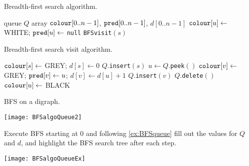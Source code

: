 \begin{algorithm}[H]
  \caption{Breadth-first search algorithm.}
    \label{alg:BFScode}
\begin{algorithmic}[1]
	\State queue $Q$  
	\State array $\operatorname{\text{\texttt{colour}}}[0..n-1]$, $\operatorname{\text{\texttt{pred}}}[0..n-1]$, $d[0..n-1]$ 
		\State $\operatorname{\text{\texttt{colour}}}[u] \gets $ WHITE; $\operatorname{\text{\texttt{pred}}}[u] \gets $ \texttt{null} 
	\EndFor
		 
			\State \texttt{BFSvisit}$(s)$
		\EndIf
	\EndFor
	\State {}
\EndFunction
\end{algorithmic}
\end{algorithm}

\begin{algorithm}[H]
  \caption{Breadth-first search visit algorithm.}
     \label{alg:BFSvisitcode}
  \begin{algorithmic}[1]
	\State $\operatorname{\text{\texttt{colour}}}[s] \gets $ GREY; $d[s] \gets 0$ 
	\State $Q$.\texttt{insert}$(s)$ 
		\State $u \gets Q$.\texttt{peek}$()$  
			 
				\State $\operatorname{\text{\texttt{colour}}}[v] \gets $ GREY; $\operatorname{\text{\texttt{pred}}}[v] \gets u$; $d[v] \gets d[u]+1$
				\State $Q$.\texttt{insert}$(v)$ 
			\EndIf
		\EndFor
		\State $Q$.\texttt{delete}$()$  
		\State $\operatorname{\text{\texttt{colour}}}[u] \gets $ BLACK
	\EndWhile
\EndFunction
\end{algorithmic}
\end{algorithm}

\begin{Boxample} \label{ex:BFSqueue}
BFS on a digraph.
\begin{center}
  \texttt{[image: BFSalgoQueue2]}
\end{center}
\end{Boxample}

\begin{Boxample}[1]
Execute BFS starting at $0$ and following \cref{ex:BFSqueue} fill out the values for $Q$ and $d$, and highlight the BFS search tree after each step. 
\begin{center}
  \texttt{[image: BFSalgoQueueEx]}
\end{center}
\end{Boxample}

